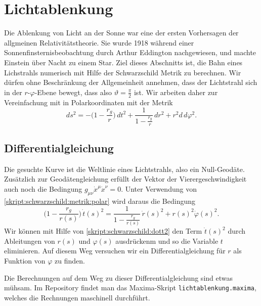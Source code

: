 %
%
%
\section{Lichtablenkung}
Die Ablenkung von Licht an der Sonne war eine der ersten Vorhersagen der
allgmeinen Relativitätstheorie.
Sie wurde 1918 während einer Sonnenfinsternisbeobachtung durch
Arthur Eddington nachgewiesen, und machte Einstein über Nacht zu einem Star.
Ziel dieses Abschnitts ist, die Bahn eines Lichstrahls numerisch
mit Hilfe der Schwarzschild Metrik zu berechnen.
Wir dürfen ohne Beschränkung der Allgemeinheit annehmen, dass der Lichtstrahl
sich in der $r$-$\varphi$-Ebene bewegt, dass also $\vartheta=\frac\pi2$ ist.
Wir arbeiten daher zur Vereinfachung mit in Polarkoordinaten mit der Metrik
\begin{equation}
ds^2
=
-\biggl(1-\frac{r_g}{r}\biggr)\,dt^2
+ \frac{1}{\displaystyle 1-\frac{r_g}{r}}\,dr^2
+ r^2d\,d\varphi^2.
\label{skript:schwarzschild:metrik:polar}
\end{equation}

\subsection{Differentialgleichung}
Die gesuchte Kurve ist die Weltlinie eines Lichtstrahls, also ein Null-Geodäte. 
Zusätzlich zur Geodätengleichung erfüllt der Vektor der Vierergeschwindigkeit
auch noch die Bedingung $g_{\mu\nu}\dot x^\mu \dot x^\nu=0$.
Unter Verwendung von \eqref{skript:schwarzschild:metrik:polar}
wird daraus die Bedingung
\begin{equation}
\biggl(1-\frac{r_g}{r(s)}\biggr)\,\dot t(s)^2
=
\frac{1}{\displaystyle 1-\frac{r_g}{r(s)}}\,\dot r(s)^2
+ r(s)^2\dot \varphi(s)^2.
\label{skript:schwarzschild:dott2}
\end{equation}
Wir können mit Hilfe von \eqref{skript:schwarzschild:dott2}
den Term $\dot t(s)^2$ durch Ableitungen von $r(s)$ und $\varphi(s)$
ausdrückenm und so die Variable $t$ eliminieren.
Auf diesem Weg versuchen wir ein Differentialgleichung für $r$
als Funktion von $\varphi$ zu finden.

Die Berechnungen auf dem Weg zu dieser Differentialgleichung sind
etwas mühsam.
Im Repository findet man das Maxima-Skript \texttt{lichtablenkung.maxima},
welches die Rechnungen maschinell durchführt.

